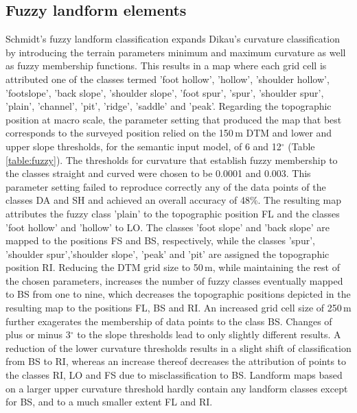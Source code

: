 \documentclass[preprint,12pt,authoryear]{elsarticle}
\begin{document}
\subsection{Fuzzy landform elements}
Schmidt's fuzzy landform classification expands Dikau's curvature classification by introducing the terrain parameters minimum and maximum curvature as well as fuzzy membership functions. This results in a map where each grid cell is attributed one of the classes termed 'foot hollow', 'hollow', 'shoulder hollow', 'footslope', 'back slope', 'shoulder slope', 'foot spur', 'spur', 'shoulder spur', 'plain', 'channel', 'pit', 'ridge', 'saddle' and 'peak'.
Regarding the topographic position at macro scale, the parameter setting that produced the map that best corresponds to the surveyed position relied on the 150\,m DTM and lower and upper slope thresholds, for the semantic input model, of 6 and 12$^{\circ}$ (Table\,\ref{table:fuzzy}). The thresholds for curvature that establish fuzzy membership to the classes straight and curved were chosen to be 0.0001 and 0.003. This parameter setting failed to reproduce correctly any of the data points of the classes DA and SH and achieved an overall accuracy of 48\%. The resulting map attributes the fuzzy class 'plain' to the topographic position FL and the classes 'foot hollow' and 'hollow' to LO. The classes 'foot slope' and 'back slope' are mapped to the positions FS and BS, respectively, while the classes 'spur', 'shoulder spur','shoulder slope', 'peak' and 'pit' are assigned the topographic position RI. Reducing the DTM grid size to 50\,m, while maintaining the rest of the chosen parameters, increases the number of fuzzy classes eventually mapped to BS from one to nine, which decreases the topographic positions depicted in the resulting map to the positions FL, BS and RI. An increased grid cell size of 250\,m further exagerates the membership of data points to the class BS. Changes of plus or minus 3$^{\circ}$ to the slope thresholds lead to only slightly different results. A reduction of the lower curvature thresholds results in a slight shift of classification from BS to RI, whereas an increase thereof decreases the attribution of points to the classes RI, LO and FS due to misclassification to BS. Landform maps based on a larger upper curvature threshold hardly contain any landform classes except for BS, and to a much smaller extent FL and RI.
\end{document}
